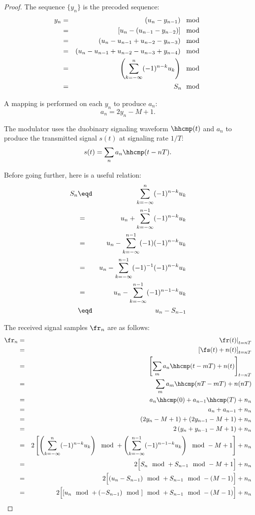\begin{proof}

The sequence $\{y_n\}$ is the precoded sequence:
\begin{eqnarray*}
   y_n
     &=& \left( u_n - y_{n-1} \right)\mod
   \\&=& \left[ u_n - (u_{n-1}-y_{n-2}) \right]\mod
   \\&=& \left( u_n - u_{n-1} + u_{n-2}-y_{n-3} \right)\mod
   \\&=& \left( u_n - u_{n-1} + u_{n-2}-u_{n-3}+y_{n-4} \right)\mod
   \\&=& \left( \sum_{k=-\infty}^n (-1)^{n-k} u_k \right)\mod
   \\&=& S_n \mod
\end{eqnarray*}

A mapping is performed on each $y_n$ to produce $a_n$:
\[ a_n = 2y_n - M + 1.\]

The modulator uses the duobinary signaling waveform $\hhcmp(t)$
and $a_n$ to produce the transmitted signal $s(t)$ at signaling
rate $1/T$:
\[ s(t) = \sum_n a_n \hhcmp(t-nT). \]


Before going further, here is a useful relation:
\begin{eqnarray*}
  S_n
    &\eqd& \sum_{k=-\infty}^{n} (-1)^{n-k} u_k
  \\&=&    u_n + \sum_{k=-\infty}^{n-1} (-1)^{n-k} u_k
  \\&=&    u_n - \sum_{k=-\infty}^{n-1} (-1)(-1)^{n-k} u_k
  \\&=&    u_n - \sum_{k=-\infty}^{n-1} (-1)^{-1}(-1)^{n-k} u_k
  \\&=&    u_n - \sum_{k=-\infty}^{n-1} (-1)^{n-1-k} u_k
  \\&\eqd& u_n - S_{n-1}
\end{eqnarray*}


The received signal samples $\fr_n$ are as follows:
\begin{eqnarray*}
   \fr_n
     &=& \left. \fr(t) \right|_{t=nT}
   \\&=& \left[ \fs(t) + n(t) \right]_{t=nT}
   \\&=& \left[ \sum_m a_n \hhcmp(t-mT) + n(t) \right]_{t=nT}
   \\&=& \sum_m a_m \hhcmp(nT-mT) + n(nT)
   \\&=& a_n\hhcmp(0) + a_{n-1}\hhcmp(T) + n_n
   \\&=& a_n + a_{n-1} + n_n
   \\&=& \left( 2y_n - M + 1 \right) + \left(2y_{n-1} - M + 1 \right) + n_n
   \\&=& 2\left( y_n + y_{n-1} - M + 1 \right) + n_n
   \\&=& 2\left[
           \left( \sum_{k=-\infty}^n (-1)^{n-k} u_k \right)\mod +
           \left( \sum_{k=-\infty}^{n-1} (-1)^{n-1-k} u_k \right)\mod
           - M + 1 \right] + n_n
   \\&=& 2\Big[ S_n\mod + S_{n-1}\mod - M + 1 \Big] + n_n
   \\&=& 2\Big[ (u_n - S_{n-1})\mod + S_{n-1}\mod - (M - 1) \Big] + n_n
   \\&=& 2\Big[ [u_n\mod + (- S_{n-1})\mod]\mod + S_{n-1}\mod - (M - 1) \Big] + n_n
\end{eqnarray*}


\end{proof}
